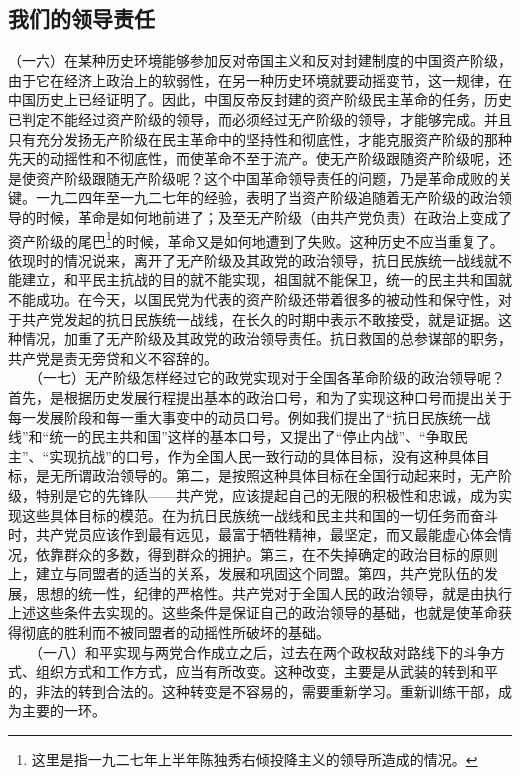 \documentclass[cn,11pt,chinese]{elegantbook}
\def\myformat#1{\hfil\hfil #1}
\begin{document}
\subsection*{\myformat{我们的领导责任 }}
（一六）在某种历史环境能够参加反对帝国主义和反对封建制度的中国资产阶级，由于它在经济上政治上的软弱性，在另一种历史环境就要动摇变节，这一规律，在中国历史上已经证明了。因此，中国反帝反封建的资产阶级民主革命的任务，历史已判定不能经过资产阶级的领导，而必须经过无产阶级的领导，才能够完成。并且只有充分发扬无产阶级在民主革命中的坚持性和彻底性，才能克服资产阶级的那种先天的动摇性和不彻底性，而使革命不至于流产。使无产阶级跟随资产阶级呢，还是使资产阶级跟随无产阶级呢？这个中国革命领导责任的问题，乃是革命成败的关键。一九二四年至一九二七年的经验，表明了当资产阶级追随着无产阶级的政治领导的时候，革命是如何地前进了；及至无产阶级（由共产党负责）在政治上变成了资产阶级的尾巴\footnote[22]{ 这里是指一九二七年上半年陈独秀右倾投降主义的领导所造成的情况。 }的时候，革命又是如何地遭到了失败。这种历史不应当重复了。依现时的情况说来，离开了无产阶级及其政党的政治领导，抗日民族统一战线就不能建立，和平民主抗战的目的就不能实现，祖国就不能保卫，统一的民主共和国就不能成功。在今天，以国民党为代表的资产阶级还带着很多的被动性和保守性，对于共产党发起的抗日民族统一战线，在长久的时期中表示不敢接受，就是证据。这种情况，加重了无产阶级及其政党的政治领导责任。抗日救国的总参谋部的职务，共产党是责无旁贷和义不容辞的。\\
　　（一七）无产阶级怎样经过它的政党实现对于全国各革命阶级的政治领导呢？首先，是根据历史发展行程提出基本的政治口号，和为了实现这种口号而提出关于每一发展阶段和每一重大事变中的动员口号。例如我们提出了“抗日民族统一战线”和“统一的民主共和国”这样的基本口号，又提出了“停止内战”、“争取民主”、“实现抗战”的口号，作为全国人民一致行动的具体目标，没有这种具体目标，是无所谓政治领导的。第二，是按照这种具体目标在全国行动起来时，无产阶级，特别是它的先锋队——共产党，应该提起自己的无限的积极性和忠诚，成为实现这些具体目标的模范。在为抗日民族统一战线和民主共和国的一切任务而奋斗时，共产党员应该作到最有远见，最富于牺牲精神，最坚定，而又最能虚心体会情况，依靠群众的多数，得到群众的拥护。第三，在不失掉确定的政治目标的原则上，建立与同盟者的适当的关系，发展和巩固这个同盟。第四，共产党队伍的发展，思想的统一性，纪律的严格性。共产党对于全国人民的政治领导，就是由执行上述这些条件去实现的。这些条件是保证自己的政治领导的基础，也就是使革命获得彻底的胜利而不被同盟者的动摇性所破坏的基础。\\
　　（一八）和平实现与两党合作成立之后，过去在两个政权敌对路线下的斗争方式、组织方式和工作方式，应当有所改变。这种改变，主要是从武装的转到和平的，非法的转到合法的。这种转变是不容易的，需要重新学习。重新训练干部，成为主要的一环。\\
\end{document}
